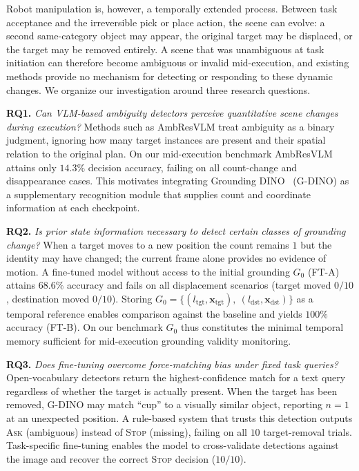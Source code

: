 \documentclass{article}
\begin{document}
Robot manipulation is, however, a temporally extended process. Between
task acceptance and the irreversible pick or place action, the scene
can evolve: a second same-category object may appear, the original
target may be displaced, or the target may be removed entirely. A scene
that was unambiguous at task initiation can therefore become ambiguous
or invalid mid-execution, and existing methods provide no mechanism for
detecting or responding to these dynamic changes. We organize our
investigation around three research questions.

\textbf{RQ1.} \emph{Can VLM-based ambiguity detectors perceive
quantitative scene changes during execution?} Methods such as AmbResVLM
treat ambiguity as a binary judgment, ignoring how many target instances
are present and their spatial relation to the original plan. On our
mid-execution benchmark AmbResVLM attains only $14.3\%$ decision
accuracy, failing on all count-change and disappearance cases. This
motivates integrating Grounding DINO~\cite{gdino} (G-DINO) as a
supplementary recognition module that supplies count and coordinate
information at each checkpoint.

\textbf{RQ2.} \emph{Is prior state information necessary to detect
certain classes of grounding change?} When a target moves to a new
position the count remains $1$ but the identity may have changed; the
current frame alone provides no evidence of motion. A fine-tuned model
without access to the initial grounding $G_0$ (FT-A) attains $68.6\%$
accuracy and fails on all displacement scenarios (target moved $0/10$,
destination moved $0/10$). Storing
$G_0 = \{(l_\text{tgt}, \mathbf{x}_\text{tgt}),\
       (l_\text{dst}, \mathbf{x}_\text{dst})\}$
as a temporal reference enables comparison against the baseline and
yields $100\%$ accuracy (FT-B). On our benchmark $G_0$ thus constitutes
the minimal temporal memory sufficient for mid-execution grounding
validity monitoring.

\textbf{RQ3.} \emph{Does fine-tuning overcome force-matching bias under
fixed task queries?} Open-vocabulary detectors return the
highest-confidence match for a text query regardless of whether the
target is actually present. When the target has been removed, G-DINO
may match ``cup'' to a visually similar object, reporting $n=1$ at an
unexpected position. A rule-based system that trusts this detection
outputs \textsc{Ask} (ambiguous) instead of \textsc{Stop} (missing),
failing on all $10$ target-removal trials. Task-specific fine-tuning
enables the model to cross-validate detections against the image and
recover the correct \textsc{Stop} decision ($10/10$).
\end{document}
